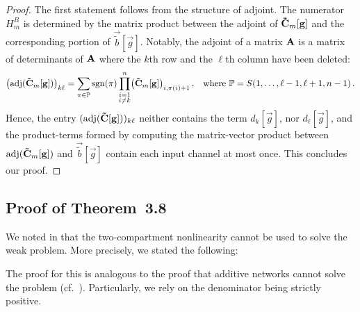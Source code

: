 \begin{proof}
The first statement follows from the structure of adjoint.
The numerator $H_m^B$ is determined by the matrix product between the adjoint of $\mathbf{\tilde C}_m[\mathbf{g}]$ and the corresponding portion of $\vec{\tilde b}[\vec g]$.
Notably, the adjoint of a matrix $\mathbf{A}$ is a matrix of determinants of $\mathbf{A}$ where the $k$th row and the $\ell$th column have been deleted:
\begin{align*}
	\bigl(\operatorname{\mathrm{adj}}(\mathbf{\tilde C}_m[\mathbf{g}])\bigr)_{k\ell}
		&= \sum_{\pi \in \mathbb{P}} \operatorname{\mathrm{sgn}}(\pi) \prod_{\substack{i=1\\i \neq k}}^n \bigl( \mathbf{\tilde C}_m[\mathbf{g}] \bigr)_{i, \pi(i) + 1} \,,
	& \text{where } \mathbb{P} = S({1, \ldots, \ell - 1, \ell + 1, n - 1}) \,.
\end{align*}
Hence, the entry $(\operatorname{\mathrm{adj}}(\mathbf{\tilde C}[\mathbf{g}]))_{k\ell}$ neither contains the term $d_{k}[\vec g]$, nor $d_{\ell}[\vec g]$, and the product-terms formed by computing the matrix-vector product between $\operatorname{\mathrm{adj}}(\mathbf{\tilde C}_m[\mathbf{g}])$ and $\vec{\tilde b}[\vec g]$ contain each input channel at most once.
This concludes our proof.
\end{proof}

\pagebreak

\subsection{Proof of Theorem~3.8}
\label{app:thm_two_comp_xor}

We noted in  that the two-compartment \LIF nonlinearity cannot be used to solve the weak \XOR problem.
More precisely, we stated the following:

\ThmTwoCompXor*

The proof for this is analogous to the proof that additive networks cannot solve the \XOR problem (cf.~).
Particularly, we rely on the denominator being strictly positive.

